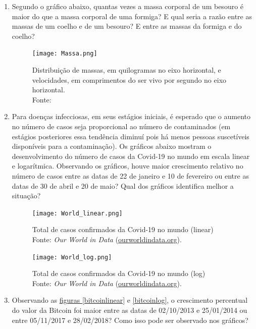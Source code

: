 \begin{enumerate}

\item \label{Exer1} Segundo o gráfico abaixo, quantas vezes a massa corporal de um besouro é maior do que a massa corporal de uma formiga? E qual seria a razão entre as massas de um coelho e de um besouro? E entre as massas da formiga e do coelho?

\begin{figure}[H]
\centering

\texttt{[image: Massa.png]}
\caption{{Distribuição de massas, em quilogramas no eixo horizontal, e velocidades, em comprimentos do ser vivo por segundo no eixo horizontal.} \\ Fonte: \cite{Mayer15}
}
\end{figure}


\item \label{Exer2} Para doenças infecciosas, em seus estágios iniciais, é esperado que o aumento no número de casos seja proporcional ao número de contaminados (em estágios posteriores essa tendência diminuí pois há menos pessoas suscetíveis disponíveis para a contaminação). Os gráficos abaixo mostram o desenvolvimento  do número de casos da Covid-19 no mundo em escala linear e logarítmica. Observando os gráficos, houve maior crescimento relativo no número de casos entre as datas de 22 de janeiro e 10 de fevereiro ou entre as datas de 30 de abril e 20 de maio? Qual dos gráficos identifica melhor a situação?

\begin{figure}[H]
\centering

\texttt{[image: World\_linear.png]}
\caption{Total de casos confirmados da Covid-19 no mundo (linear)\\
Fonte: \textit{Our World in Data} (\url{ourworldindata.org}).}
\end{figure}

\begin{figure}[H]
\centering

\texttt{[image: World\_log.png]}
\caption{Total de casos confirmados da Covid-19 no mundo (log)\\
Fonte: \textit{Our World in Data} (\url{ourworldindata.org}).}
\end{figure}


\item \label{Exer3} Observando as \hyperref[bitcoinlinear]{figuras \ref{bitcoinlinear}} e \ref{bitcoinlog}, o crescimento percentual do valor da Bitcoin foi maior entre as datas de 02/10/2013 e 25/01/2014 ou entre 05/11/2017 e 28/02/2018? Como isso pode ser observado nos gráficos?



\end{enumerate}
